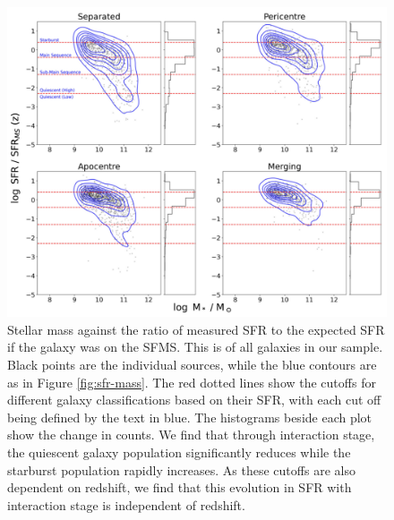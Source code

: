 \begin{figure}
\centering
\includegraphics[width=\textwidth]{Chapter3/figures/sfr-clsf-dist.pdf}
\caption[Stellar mass against the ratio of measured SFR to the expected SFR if the galaxy was on the SFMS.]{Stellar mass against the ratio of measured SFR to the expected SFR if the galaxy was on the SFMS. This is of all galaxies in our sample. Black points are the individual sources, while the blue contours are as in Figure \ref{fig:sfr-mass}. The red dotted lines show the cutoffs for different galaxy classifications based on their SFR, with each cut off being defined by the text in blue. The histograms beside each plot show the change in counts. We find that through interaction stage, the quiescent galaxy population significantly reduces while the starburst population rapidly increases. As these cutoffs are also dependent on redshift, we find that this evolution in SFR with interaction stage is independent of redshift.}
\label{fig:sfr-clsf}
\end{figure}

